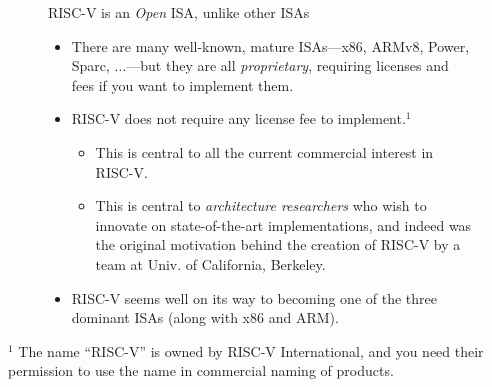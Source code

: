 \documentclass{article}
\begin{document}
\begin{figure}[htp]
    \centering
    {\Huge RISC-V is an \emph{Open} ISA, unlike other ISAs}

    \vspace{0.5in}

    \begin{minipage}{9in}\LARGE
      \begin{itemize}

        \item There are many well-known, mature ISAs---x86, ARMv8,
          Power, Sparc, ...---but they are all \emph{proprietary},
          requiring licenses and fees if you want to implement them.

        \item RISC-V does not require any license fee to
          implement.$^1$

          \begin{itemize}
          \item This is central to all the current commercial interest in RISC-V.
          \item This is central to \emph{architecture researchers} who
            wish to innovate on state-of-the-art implementations, and
            indeed was the original motivation behind the creation of
            RISC-V by a team at Univ. of California, Berkeley.
          \end{itemize}

        \item RISC-V seems well on its way to becoming one of the
          three dominant ISAs (along with x86 and ARM).
      \end{itemize}
    \end{minipage}
\end{figure}

\vfill

{$^1$ The name ``RISC-V'' is owned by RISC-V International, and you
  need their permission to use the name in commercial naming of
  products.}

\clearpage

\end{document}
